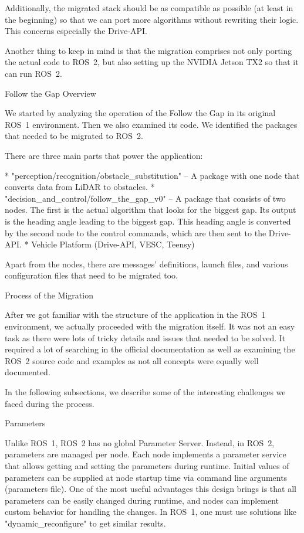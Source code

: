 Additionally, the migrated stack should be as compatible as possible (at least in the beginning) so that we can port more algorithms without rewriting their logic. This concerns especially the Drive-API.

Another thing to keep in mind is that the migration comprises not only porting the actual code to ROS~2, but also setting up the NVIDIA Jetson TX2 so that it can run ROS~2.


\sec Follow the Gap Overview

We started by analyzing the operation of the Follow the Gap in its original ROS~1 environment. Then we also examined its code. We identified the packages that needed to be migrated to ROS~2.

There are three main parts that power the application:

\begitems
* "perception/recognition/obstacle_substitution" – A package with one node that converts data from LiDAR to obstacles.
* "decision_and_control/follow_the_gap_v0" – A package that consists of two nodes. The first is the actual algorithm that looks for the biggest gap. Its output is the heading angle leading to the biggest gap. This heading angle is converted by the second node to the control commands, which are then sent to the Drive-API.
* Vehicle Platform (Drive-API, VESC, Teensy)
\enditems

Apart from the nodes, there are messages' definitions, launch files, and various configuration files that need to be migrated too.


\sec Process of the Migration

After we got familiar with the structure of the application in the ROS~1 environment, we actually proceeded with the migration itself. It was not an easy task as there were lots of tricky details and issues that needed to be solved. It required a lot of searching in the official documentation as well as examining the ROS~2 source code and examples as not all concepts were equally well documented.

In the following subsections, we describe some of the interesting challenges we faced during the process.

\secc Parameters

Unlike ROS~1, ROS~2 has no global Parameter Server. Instead, in ROS~2, parameters are managed per node. Each node implements a parameter service that allows getting and setting the parameters during runtime. Initial values of parameters can be supplied at node startup time via command line arguments (parameters file). One of the most useful advantages this design brings is that all parameters can be easily changed during runtime, and nodes can implement custom behavior for handling the changes. In ROS~1, one must use solutions like "dynamic_reconfigure" to get similar results.

